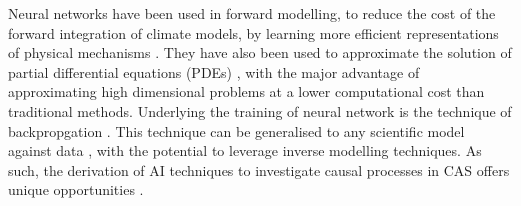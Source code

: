%
Neural networks have been used in forward modelling, to reduce the cost of the forward integration of climate models, by learning more efficient representations of physical mechanisms \citep{XXX}.
% 
They have also been used to approximate the solution of partial differential equations (PDEs) \citep{Sirignano2018dgm}, with the major advantage of approximating high dimensional problems at a lower computational cost than traditional methods.
% 
% 
%
% 
Underlying the training of neural network is the technique of backpropgation \citep{XXX}. This technique can be generalised to any scientific model against data \citep{Rackauckas2020}, with the potential to leverage inverse modelling techniques. %
% 
% 
As such, the derivation of AI techniques to investigate causal processes in CAS offers unique opportunities \citep{Frank2022}.


